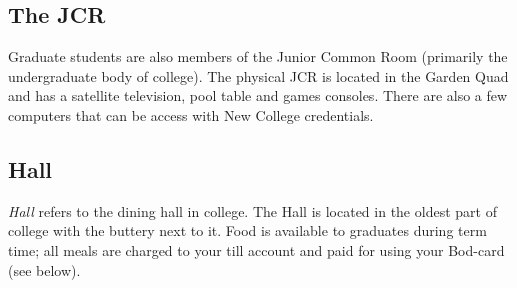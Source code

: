 \documentclass[a4paper,fleqn,12pt]{book} %
\begin{document}
\subsection{The JCR}

Graduate students are also members of the Junior Common Room (primarily the undergraduate body of college). The physical JCR is located in the Garden Quad and has a satellite television, pool table and games consoles. There are also a few computers that can be access with New College credentials.
\subsection{Hall}

\emph{Hall} refers to the dining hall in college. The Hall is located in the oldest
part of college with the buttery next to it. Food is available to graduates during term time; all meals are charged to your till account and paid for using your Bod-card (see below). 

\smallskip
\end{document}
